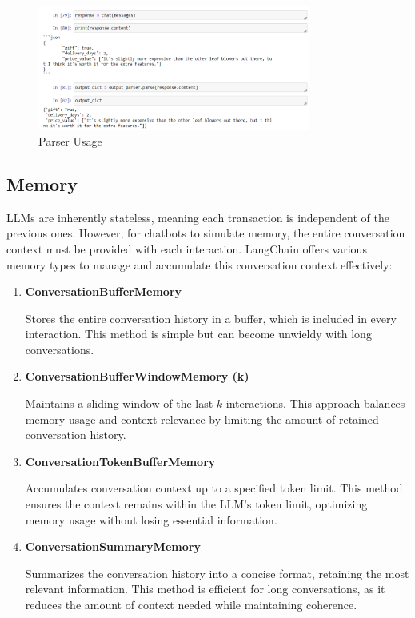 \documentclass{article}
\begin{document}
\bigskip

\begin{figure}[h]
    \centering
    \includegraphics[width=0.8\textwidth]{Images/Parser.png}
    \caption{Parser Usage}
    \label{fig:example}
\end{figure}

\pagebreak

\subsection{Memory}

LLMs are inherently stateless, meaning each transaction is independent of the previous ones. However, for chatbots to simulate memory, the entire conversation context must be provided with each interaction. LangChain offers various memory types to manage and accumulate this conversation context effectively:

\begin{enumerate}[label=\textbf{\arabic*.}, left=0pt, align=left, itemindent=*]
    \setlength{\itemsep}{15pt}
    \item \textbf{ConversationBufferMemory}

    Stores the entire conversation history in a buffer, which is included in every interaction. This method is simple but can become unwieldy with long conversations.

    \item \textbf{ConversationBufferWindowMemory (k)}

    Maintains a sliding window of the last \( k \) interactions. This approach balances memory usage and context relevance by limiting the amount of retained conversation history.

    \item \textbf{ConversationTokenBufferMemory}

    Accumulates conversation context up to a specified token limit. This method ensures the context remains within the LLM's token limit, optimizing memory usage without losing essential information.

    \item \textbf{ConversationSummaryMemory}

    Summarizes the conversation history into a concise format, retaining the most relevant information. This method is efficient for long conversations, as it reduces the amount of context needed while maintaining coherence.
\end{enumerate}
\end{document}
